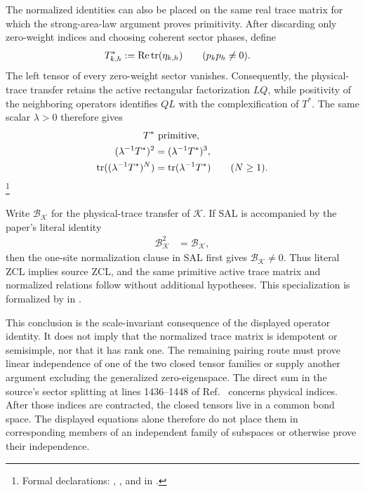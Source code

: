 \documentclass{article}
\begin{document}
The normalized identities can also be placed on the same real trace matrix
for which the strong-area-law argument proves primitivity. After discarding
only zero-weight indices and choosing coherent sector phases, define
\begin{align}
    T^*_{k,h}
        &:= \operatorname{Re}\operatorname{tr}(\eta_{k,h})
        \qquad (p_kp_h\neq 0).
    \label{eq:cpgsv17_active_real_trace_matrix}
\end{align}
The left tensor of every zero-weight sector vanishes. Consequently, the
physical-trace transfer retains the active rectangular factorization $LQ$,
while positivity of the neighboring operators identifies $QL$ with the
complexification of $T^*$. The same scalar $\lambda>0$ therefore gives
\begin{align}
    T^*
        &\ \text{primitive},
    \label{eq:cpgsv17_active_trace_matrix_primitive}\\
    (\lambda^{-1}T^*)^2
        &= (\lambda^{-1}T^*)^3,
    \label{eq:cpgsv17_active_trace_matrix_square_cube}\\
    \operatorname{tr}((\lambda^{-1}T^*)^N)
        &= \operatorname{tr}(\lambda^{-1}T^*)
        \qquad (N\geq 1).
    \label{eq:cpgsv17_active_trace_matrix_constant_traces}
\end{align}
\footnote{\sloppy Formal declarations:
{\scriptsize{}},
{\scriptsize{}},
and
{\scriptsize{}}
in .}

Write $\mathcal B_{\mathcal K}$ for the physical-trace transfer of
$\mathcal K$. If SAL is accompanied by the paper's literal identity
\begin{align}
    \mathcal B_{\mathcal K}^2
        &= \mathcal B_{\mathcal K},
    \label{eq:cpgsv17_literal_zcl_identity}
\end{align}
then the one-site normalization clause in SAL first gives
$\mathcal B_{\mathcal K}\neq 0$. Thus literal ZCL implies source ZCL, and the
same primitive active trace matrix and normalized relations follow without
additional hypotheses. This specialization is formalized by
in .

This conclusion is the scale-invariant consequence of the displayed operator
identity. It does not imply that the normalized trace matrix is idempotent or
semisimple, nor that it has rank one. The remaining pairing route must prove
linear independence of one of the two closed tensor families or supply another
argument excluding the generalized zero-eigenspace. The direct sum in the
source's sector splitting at lines 1436--1448 of
Ref.~\cite{Cirac2016MPDO_arXiv} concerns physical indices. After those indices
are contracted, the closed tensors live in a common bond space. The displayed
equations alone therefore do not place them in corresponding members of an
independent family of subspaces or otherwise prove their independence.
\end{document}
